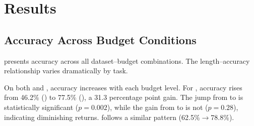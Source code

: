 \section{Results}
\label{sec:results}

\subsection{Accuracy Across Budget Conditions}
\label{sec:results:accuracy}

 presents accuracy across all dataset--budget combinations. The length--accuracy relationship varies dramatically by task.

\begin{table}[t]
\centering
\caption{Accuracy (\%) by dataset and budget condition with 95\% bootstrap confidence intervals. Best fixed-budget result per dataset in \textbf{bold}. The adaptive strategy uses confidence-based escalation from \shortbudget to \longbudget.}
\label{tab:main_results}
\end{table}

 On both \math and \mmlupro, accuracy increases with each budget level. For \math, accuracy rises from 46.2\% (\nocot) to 77.5\% (\unconst), a 31.3 percentage point gain. The jump from \nocot to \medbudget is statistically significant ($p{=}0.002$), while the gain from \medbudget to \unconst is not ($p{=}0.28$), indicating diminishing returns. \mmlupro follows a similar pattern (62.5\%$\rightarrow$78.8\%).

